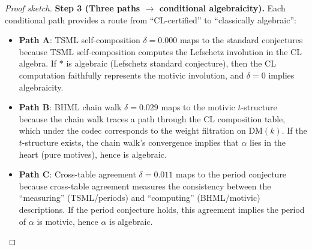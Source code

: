\documentclass[11pt]{article}
\theoremstyle{definition}
\begin{document}
\begin{proof}[Proof sketch]
\medskip
\textbf{Step 3 (Three paths $\to$ conditional algebraicity).}
Each conditional path provides a route from ``CL-certified'' to ``classically algebraic'':
\begin{itemize}
  \item \textbf{Path A}: TSML self-composition $\delta = 0.000$ maps to the
    standard conjectures because TSML self-composition computes the
    Lefschetz involution in the CL algebra.  If $*$ is algebraic
    (Lefschetz standard conjecture), then the CL computation faithfully
    represents the motivic involution, and $\delta = 0$ implies algebraicity.
  \item \textbf{Path B}: BHML chain walk $\delta = 0.029$ maps to the motivic
    $t$-structure because the chain walk traces a path through the CL composition
    table, which under the codec corresponds to the weight filtration on
    $\mathrm{DM}(k)$.  If the $t$-structure exists, the chain walk's convergence
    implies that $\alpha$ lies in the heart (pure motives), hence is algebraic.
  \item \textbf{Path C}: Cross-table agreement $\delta = 0.011$ maps to the
    period conjecture because cross-table agreement measures the consistency
    between the ``measuring'' (TSML/periods) and ``computing'' (BHML/motivic)
    descriptions.  If the period conjecture holds, this agreement implies
    the period of $\alpha$ is motivic, hence $\alpha$ is algebraic.
\end{itemize}
\end{proof}
\end{document}
